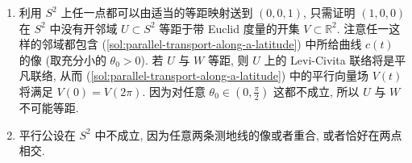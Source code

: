 \begin{description}[font=\normalfont,leftmargin=2em,labelwidth=1.5em]
\begin{enumerate}[label=(\alph*),ref=\alph*,leftmargin=*]
\[  \iff V^\theta=A\cos((\cos\theta_0)t)+B\sin((\cos\theta_0)t),
\]
其中 $A,B\in\mathbb{R}$ 为常数, 因而
\[
  V^\varphi=\frac{1}{\sin\theta_0\cos\theta_0}\dot V^\theta
  =-\frac{A}{\sin\theta_0}\sin((\cos\theta_0)t)+\frac{B}{\sin\theta_0}\cos((\cos\theta_0)t).
\]
初始条件为 $V^\theta(0)=1$, $V^\varphi(0)=0$, 故 $A=1$, $B=0$, 从而
\begin{align*}
  V^\theta&=\cos((\cos\theta_0)t);\\
  V^\varphi&=-\frac{1}{\sin\theta_0}\sin((\cos\theta_0)t).
\end{align*}
特别注意,
\[
  \langle V(t),V(t)\rangle=(V^\theta)^2+\sin^2\theta_0(V^\varphi)^2=1.
\]
所以 $V(0)$ 和 $V(2\pi)$ 之间的角 $\alpha$ 由
\[
  \cos\alpha=\langle V(0),V(2\pi)\rangle=V^\theta(2\pi)=\cos(2\pi\cos\theta_0)
\]
给出, 即
\[
  \alpha=2\pi\cos\theta_0\quad\text{或}\quad\alpha=2\pi(1-\cos\theta_0)
\]
(取决于选择度量哪一个角).
\item 利用 $S^2$ 上任一点都可以由适当的等距映射送到 $(0,0,1)$, 只需证明 $(1,0,0)$ 在 $S^2$ 中没有开邻域 $U\subset S^2$ 等距于带 Euclid 度量的开集 $V\subset\mathbb{R}^2$. 注意任一这样的邻域都包含 (\ref{sol:parallel-transport-along-a-latitude}) 中所给曲线 $c(t)$ 的像 (取充分小的 $\theta_0>0$). 若 $U$ 与 $W$ 等距, 则 $U$ 上的 Levi-Civita 联络将是平凡联络, 从而 (\ref{sol:parallel-transport-along-a-latitude}) 中的平行向量场 $V(t)$ 将满足 $V(0)=V(2\pi)$. 因为对任意 $\theta_0\in(0,\frac{\pi}{2})$ 这都不成立, 所以 $U$ 与 $W$ 不可能等距.
\item 平行公设在 $S^2$ 中不成立, 因为任意两条测地线的像或者重合, 或者恰好在两点相交.
\end{enumerate}


\end{description}
